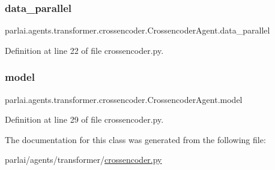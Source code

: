 \subsubsection{\texorpdfstring{data\+\_\+parallel}{data\_parallel}}
{\footnotesize\ttfamily parlai.\+agents.\+transformer.\+crossencoder.\+Crossencoder\+Agent.\+data\+\_\+parallel}



Definition at line 22 of file crossencoder.\+py.

\mbox{\label{classparlai_1_1agents_1_1transformer_1_1crossencoder_1_1CrossencoderAgent_a53447e9640405f06d1458eec65db5525}} 
\subsubsection{\texorpdfstring{model}{model}}
{\footnotesize\ttfamily parlai.\+agents.\+transformer.\+crossencoder.\+Crossencoder\+Agent.\+model}



Definition at line 29 of file crossencoder.\+py.



The documentation for this class was generated from the following file\+:\begin{DoxyCompactItemize}
\item 
parlai/agents/transformer/\hyperlink{crossencoder_8py}{crossencoder.\+py}\end{DoxyCompactItemize}
